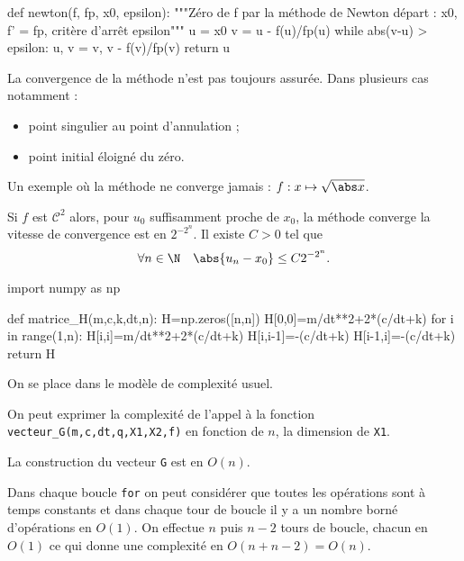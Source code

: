 
\question{}

\begin{pyverbatim}
def newton(f, fp, x0, epsilon):
    """Zéro de f par la méthode de Newton
       départ : x0, f' = fp, critère d'arrêt epsilon"""
    u = x0
    v = u - f(u)/fp(u)
    while abs(v-u) > epsilon:
        u, v = v, v - f(v)/fp(v)
    return u
\end{pyverbatim}

\question{}

La convergence de la méthode n'est pas toujours assurée. Dans plusieurs cas notamment : 
  \begin{itemize}
    \item point singulier au point d'annulation ;
    \item point initial éloigné du zéro.
  \end{itemize}
Un exemple où la méthode ne converge jamais : $f : x \mapsto \sqrt{\abs x}$. 
  
Si $f$ est $\mathscr{C}^2$ alors, pour $u_{0}$ suffisamment proche
de $x_{0}$, la méthode converge la vitesse de convergence est en $2^{-2^{n}}$.
Il existe $C>0$ tel que
\begin{equation*}
  \forall n\in\N\quad \abs{u_{n} - x_{0}} \leq C 2^{-2^{n}}.
\end{equation*}

\question{} 

\begin{pyverbatim}
import numpy as np

def matrice_H(m,c,k,dt,n):
    H=np.zeros([n,n])
    H[0,0]=m/dt**2+2*(c/dt+k)
    for i in range(1,n):
        H[i,i]=m/dt**2+2*(c/dt+k)
        H[i,i-1]=-(c/dt+k)
        H[i-1,i]=-(c/dt+k)
    return H
\end{pyverbatim}

\question{} 
On se place dans le modèle de complexité usuel.

On peut exprimer la complexité de l'appel à la fonction \texttt{vecteur\_G(m,c,dt,q,X1,X2,f)} en fonction de $n$, la dimension de \texttt{X1}. 

La construction du vecteur \texttt{G} est en $O(n)$.

Dans chaque boucle \texttt{for} on peut considérer que toutes les opérations sont à temps constants et dans chaque tour de boucle il y a un nombre borné d'opérations en $O(1)$.
On effectue $n$ puis $n-2$ tours de boucle, chacun en $O(1)$ ce qui donne une complexité en $O(n+n-2) = O(n)$.

